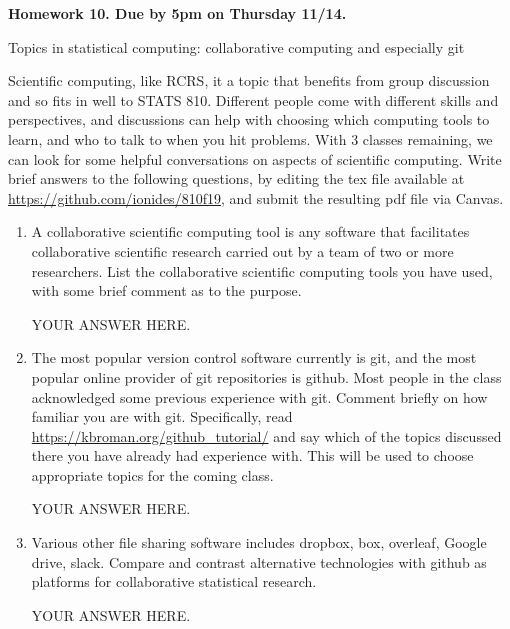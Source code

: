 \documentclass[12pt]{article}
\begin{document}
\begin{center}\bf
Homework 10. Due by 5pm on Thursday 11/14.

Topics in statistical computing: collaborative computing and especially git

\end{center}

Scientific computing, like RCRS, it a topic that benefits from group discussion and so fits in well to STATS 810. Different people come with different skills and perspectives, and discussions can help with choosing which computing tools to learn, and who to talk to when you hit problems. With 3 classes remaining, we can look for some helpful conversations on aspects of scientific computing. Write brief answers to the following questions, by editing the tex file available at \url{https://github.com/ionides/810f19}, and submit the resulting pdf file via Canvas.

\begin{enumerate}

\item A collaborative scientific computing tool is any software that facilitates collaborative scientific research carried out by a team of two or more researchers. List the collaborative scientific computing tools you have used, with some brief comment as to the purpose. 

YOUR ANSWER HERE.

\item The most popular version control software currently is git, and the most popular online provider of git repositories is github. Most people in the class acknowledged some previous experience with git. Comment briefly on how familiar you are with git. Specifically, read \url{https://kbroman.org/github_tutorial/}
and say which of the topics discussed there you have already had experience with. This will be used to choose appropriate topics for the coming class.

YOUR ANSWER HERE.

\item Various other file sharing software includes dropbox, box, overleaf, Google drive, slack. Compare and contrast alternative technologies with github as platforms for collaborative statistical research.

YOUR ANSWER HERE.

\end{enumerate}
\end{document}
